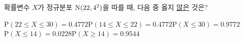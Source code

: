확률변수 $X$가 정규분포 $\mathrm{N}(22{,}\mkern3mu\mathopen{}4^2)$을 따를 때, 다음 중 옳지 \underline{않은} 것은? 
\begin{choicesv}{$\mathrm{P}(22\le X\le 30)=0.4772$}{$\mathrm{P}(14\le X\le 22)=0.4772$}{$\mathrm{P}(X\le 30)=0.9772$}{$\mathrm{P}(X\le 14)=0.0228$}{$\mathrm{P}(X\ge 14)=0.9544$}\end{choicesv}
